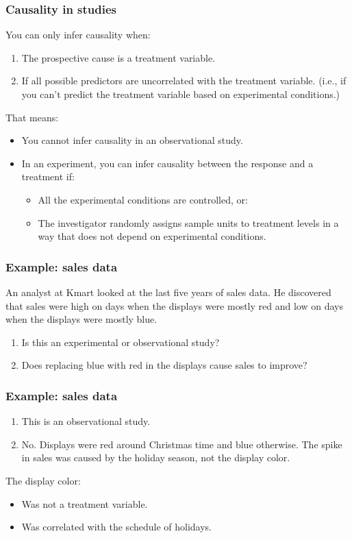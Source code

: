 \documentclass[handout]{beamer}
\numberwithin{equation}{section}
\begin{document}
\begin{frame}
\frametitle{Causality in studies}

You can only infer causality when:
\begin{enumerate}[1. ]
\item The prospective cause is a treatment variable.
\pause \item If all possible predictors are uncorrelated with the treatment variable. \pause (i.e., if you can't predict the treatment variable based on experimental conditions.)
\end{enumerate}

\pause That means:

\begin{itemize}
\item You cannot infer causality in an observational study.
\pause \item In an experiment, you can infer causality between the response and a treatment if:
\begin{itemize}
\pause \item All the experimental conditions are controlled, or:
\pause \item The investigator randomly assigns sample units to treatment levels in a way that does not depend on experimental conditions. 
\end{itemize}
\end{itemize}
\end{frame}

\begin{frame}
\frametitle{Example: sales data}

An analyst at Kmart looked at the last five years of sales data. He discovered that sales were high on days when the displays were mostly red and low on days when the displays were mostly blue. 

\begin{enumerate}
\pause \item Is this an experimental or observational study?
\pause \item Does replacing blue with red in the displays cause sales to improve?
\end{enumerate}

\end{frame}

\begin{frame}
\frametitle{Example: sales data}

\begin{enumerate}[1. ]
\item This is an observational study.
\pause \item No. Displays were red around Christmas time and blue otherwise. The spike in sales was caused by the holiday season, not the display color. 
\end{enumerate}

\pause The display color:
\begin{itemize}
\item Was not a treatment variable.
\pause \item Was correlated with the schedule of holidays.
\end{itemize}
\end{frame}
\end{document}

